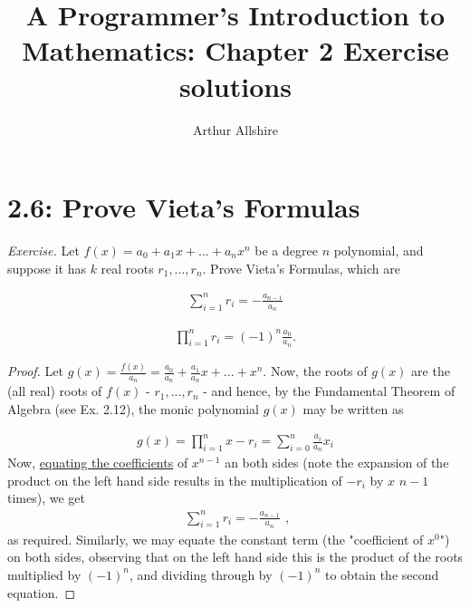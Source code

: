 \documentclass{article}
\author{Arthur Allshire}
\title{A Programmer's Introduction to Mathematics: Chapter 2 Exercise solutions}
\begin{document}
\maketitle

\section*{2.6: Prove Vieta's Formulas}
{\it Exercise.} Let $f(x) = a_0 + a_1x + ... + a_nx^n$ be a degree $n$ polynomial, and suppose
it has $k$ real roots $r_1, ..., r_n$. Prove Vieta's Formulas, which are

\[
\begin{aligned}
\displaystyle\sum_{i=1}^{n} r_i = -\frac{a_{n-1}}{a_n}
\end{aligned}
\]

\[
\begin{aligned}
\displaystyle\prod_{i=1}^{n} r_i = (-1)^n \frac{a_0}{a_n}.
\end{aligned}
\]

\begin{proof}

Let $g(x) = \frac{f(x)}{a_n} = \frac{a_0}{a_n} + \frac{a_1}{a_n}x + ... + x^n$.
Now, the roots of $g(x)$ are the (all real) roots of $f(x)$ - $r_1,...,r_n$ -
and hence, by the Fundamental Theorem of Algebra (see Ex. 2.12), the monic polynomial
$g(x)$ may be written as

\[
\begin{aligned}
g(x) = \displaystyle\prod_{i=1}^{n} x - r_i = \displaystyle\sum_{i=0}^{n} \frac{a_i}{a_n} x_i
\end{aligned}
\]
Now, \href{https://en.wikipedia.org/wiki/Equating_coefficients}{equating the coefficients}
of $x^{n-1}$ an both sides (note the expansion of the product on the left hand
side results in the multiplication of $-r_i$ by $x$ $n-1$ times), we get
\[
\begin{aligned}
\displaystyle\sum_{i=1}^{n} r_i = -\frac{a_{n-1}}{a_n}
\end{aligned},
\]as required.
Similarly, we may equate the constant term (the "coefficient of $x^0$") on both sides,
observing that on the left hand side this is the product of the roots multiplied by $(-1)^n$, and
dividing through by $(-1)^n$ to obtain the second equation.

\end{proof}
\end{document}
